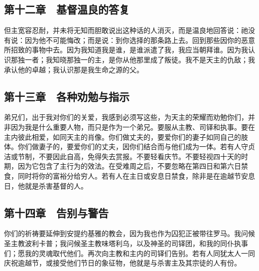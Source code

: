 
\subsection{第十二章　基督温良的答复}

但主宽容忍耐，并未将无知而胆敢说出这种话的人消灭，而是温良地回答说：祂没有说：因为他不可能悔改；而是说：到你选择的那条路上去。回到那些因你的恶意所招致的事物中去。因为我知道我是谁，是谁派遣了我，我应当朝拜谁。因为我认识那独一者；我知晓那独一的主，是你从他那里成了叛徒。我不是天主的仇敌；我承认他的卓越；我认识那是我生命之源的父。\par


\subsection{第十三章　各种劝勉与指示}

弟兄们，出于我对你们的关爱，我感到必须写这些，为天主的荣耀而劝勉你们，并非因为我是什么重要人物，而只是作为一个弟兄。要服从主教、司铎和执事。要在主内彼此相爱，如同天主的肖像。你们做丈夫的，要爱你们的妻子如同自己的肢体。你们做妻子的，要爱你们的丈夫，因你们结合而与他们成为一体。若有人守贞洁或节制，不要因此自高，免得失去赏报。不要轻看庆节。不要轻视四十天的时期，因为它包含了主行为的效法。在受难周之后，不要忽略在第四日和第六日禁食，同时将你的富裕分给穷人。若有人在主日或安息日禁食，除非是在逾越节安息日，他就是杀害基督的人。\par


\subsection{第十四章　告别与警告}

你们的祈祷要延伸到安提约基雅的教会，因为我也作为囚犯正被带往罗马。我问候圣主教波利卡普；我问候圣主教味塔利乌，以及神圣的司铎团，和我的同仆执事们；愿我的灵魂取代他们。再次向主教和主内的司铎们告别。若有人同犹太人一同庆祝逾越节，或接受他们节日的象征物，他就是与杀害主及其宗徒的人有份。\par

